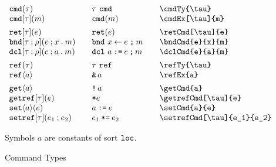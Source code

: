 \documentclass[11pt]{article}
\begin{document}
\begin{figure}

  \begin{small}
    \begin{displaymath}
      \begin{array}{l@{\qquad}l@{\qquad}l@{\qquad}l}
        \cmdTy{\tau}               & \cmdTy*{\tau}               & \verb|\cmdTy{\tau}|               \\
        \cmdEx[\tau]{m}            & \cmdEx*{m}                  & \verb|\cmdEx[\tau]{m}|            \\[1ex]
        \retCmd[\tau]{e}           & \retCmd*{e}                 & \verb|\retCmd[\tau]{e}|           \\
        \bndCmd{e}{x}{m}           & \bndCmd*{e}{x}{m}           & \verb|\bndCmd{e}{x}{m}|           \\
        \dclCmd{e}{a}{m}           & \dclCmd*{e}{a}{m}           & \verb|\dclCmd{e}{a}{m}|           \\[1ex]
        \refTy{\tau}               & \refTy*{\tau}               & \verb|\refTy{\tau}| \\
        \refEx{a}                  & \refEx*{a}                  & \verb|\refEx{a}|                  \\[1ex]
        \getCmd{a}                 & \getCmd*{a}                 & \verb|\getCmd{a}|                 \\
        \getrefCmd[\tau]{e}        & \getrefCmd*{e}              & \verb|\getrefCmd[\tau]{e}|        \\
        \setCmd{a}{e}              & \setCmd*{a}{e}              & \verb|\setCmd{a}{e}|              \\
        \setrefCmd[\tau]{e_1}{e_2} & \setrefCmd*[\tau]{e_1}{e_2} & \verb|\setrefCmd[\tau]{e_1}{e_2}|
      \end{array}
    \end{displaymath}
  \end{small}

  Symbols $a$ are constants of sort $\texttt{loc}$.

  \caption{Command Types}
  \label{fig:cmd}
\end{figure}
\end{document}
